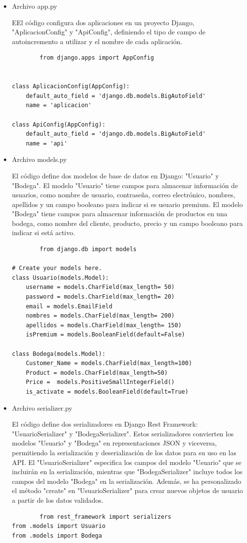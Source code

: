 \documentclass{article}
\begin{document}
\begin{itemize}
    \item Archivo app.py
    
        EEl código configura dos aplicaciones en un proyecto Django, "AplicacionConfig" y "ApiConfig", definiendo el tipo de campo de autoincremento a utilizar y el nombre de cada aplicación.
        \begin{lstlisting}
        from django.apps import AppConfig


class AplicacionConfig(AppConfig):
    default_auto_field = 'django.db.models.BigAutoField'
    name = 'aplicacion'
    
class ApiConfig(AppConfig):
    default_auto_field = 'django.db.models.BigAutoField'
    name = 'api'

  \end{lstlisting}

   \item Archivo models.py
   
        El código define dos modelos de base de datos en Django: "Usuario" y "Bodega". El modelo "Usuario" tiene campos para almacenar información de usuarios, como nombre de usuario, contraseña, correo electrónico, nombres, apellidos y un campo booleano para indicar si es usuario premium. El modelo "Bodega" tiene campos para almacenar información de productos en una bodega, como nombre del cliente, producto, precio y un campo booleano para indicar si está activo.
        \begin{lstlisting}
        from django.db import models

# Create your models here.
class Usuario(models.Model):
    username = models.CharField(max_length= 50)
    password = models.CharField(max_length= 20)
    email = models.EmailField
    nombres = models.CharField(max_length= 200)
    apellidos = models.CharField(max_length= 150)
    isPremium = models.BooleanField(default=False)

class Bodega(models.Model):
    Customer_Name = models.CharField(max_length=100)
    Product = models.CharField(max_length=50)
    Price =  models.PositiveSmallIntegerField()
    is_activate = models.BooleanField(default=True)
  \end{lstlisting}

    
     \item Archivo serializer.py
     
        El código define dos serializadores en Django Rest Framework: "UsuarioSerializer" y "BodegaSerializer". Estos serializadores convierten los modelos "Usuario" y "Bodega" en representaciones JSON y viceversa, permitiendo la serialización y deserialización de los datos para su uso en las API. El "UsuarioSerializer" especifica los campos del modelo "Usuario" que se incluirán en la serialización, mientras que "BodegaSerializer" incluye todos los campos del modelo "Bodega" en la serialización. Además, se ha personalizado el método "create" en "UsuarioSerializer" para crear nuevos objetos de usuario a partir de los datos validados.
        \begin{lstlisting}
        from rest_framework import serializers
from .models import Usuario
from .models import Bodega


\end{lstlisting}
\end{itemize}
\end{document}
